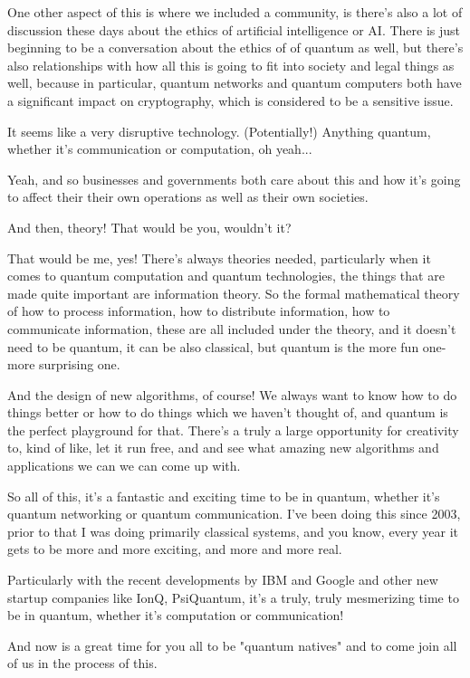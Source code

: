 One other aspect of this is where we included a community, is there's also a lot of discussion these days about the ethics of artificial intelligence or AI. There is just beginning to be a conversation about the ethics of of quantum as well, but there's also relationships with how all this is going to fit into society and legal things as well, because in particular, quantum networks and quantum computers both have a significant impact on cryptography, which is considered to be a sensitive issue.

It seems like a very disruptive technology. (Potentially!) Anything quantum, whether it's communication or computation, oh yeah...

Yeah, and so businesses and governments both care about this and how it's going to affect their their own operations as well as their own societies.

And then, theory! That would be you, wouldn't it?

That would be me, yes! There's always theories needed, particularly when it comes to quantum computation and quantum technologies, the things that are made quite important are information theory. So the formal mathematical theory of how to process information, how to distribute information, how to communicate information, these are all included under the theory, and it doesn't need to be quantum, it can be also classical, but quantum is the more fun one- more surprising one.

And the design of new algorithms, of course! We always want to know how to do things better or how to do things which we haven't thought of, and quantum is the perfect playground for that. There's a truly a large opportunity for creativity to, kind of like, let it run free, and and see what amazing new algorithms and applications we can we can come up with.

So all of this, it's a fantastic and exciting time to be in quantum, whether it's quantum networking or quantum communication. I've been doing this since 2003, prior to that I was doing primarily classical systems, and you know, every year it gets to be more and more exciting, and more and more real.

Particularly with the recent developments by IBM and Google and other new startup companies like IonQ, PsiQuantum, it's a truly, truly mesmerizing time to be in quantum, whether it's computation or communication!

And now is a great time for you all to be "quantum natives" and to come join all of us in the process of this.

